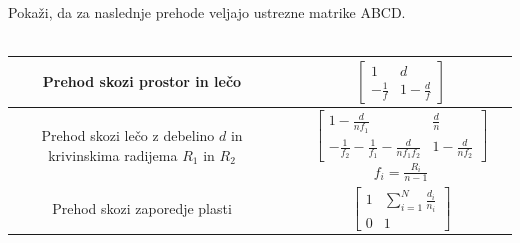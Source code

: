 \begin{definition}
Pokaži, da za naslednje prehode veljajo ustrezne matrike ABCD. \\ \\
\begin{tabular}{|c|c|c|} \hline  
      Prehod skozi prostor in lečo & \parbox[c]{3cm}{\def\svgwidth{3cm}} & 
      $\begin{bmatrix} 1 & d\\ -\frac{1}{f} & 1-\frac{d}{f} \end{bmatrix}$ \\ \hline
      \parbox[c]{12em}{Prehod skozi lečo z debelino $d$ 
      in krivinskima radijema $R_1$ in $R_2$}& 
      \parbox[c]{3cm}{\def\svgwidth{3cm}} & 
      $\begin{bmatrix} 1-\frac{d}{nf_{1}} & \frac{d}{n}\\
      -\frac{1}{f_2}- \frac{1}{f_1}-\frac{d}{nf_1f_2}& 1-\frac{d}{nf_{2}} \end{bmatrix}$
      $f_{i}=\frac{R_{i}}{n-1}$\\ \hline
      Prehod skozi zaporedje plasti & \parbox[c]{3cm}{\def\svgwidth{3cm}} & 
      $\begin{bmatrix} 1 & \sum_{i=1}^{N}\frac{d_{i}}{n_{i}}\\ 0 & 1 \end{bmatrix}$ \\ \hline 
\end{tabular}
\end{definition}
